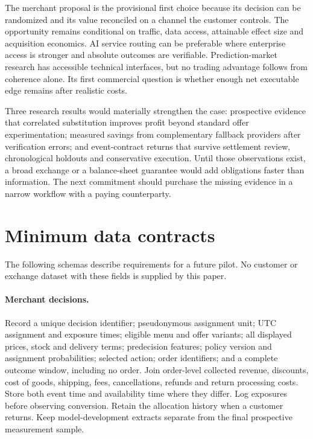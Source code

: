 \documentclass[11pt]{article}
\theoremstyle{remark}\newtheorem{example}{Example}
\begin{document}
The merchant proposal is the provisional first choice because its decision
can be randomized and its value reconciled on a channel the customer controls.
The opportunity remains conditional on traffic, data access, attainable effect
size and acquisition economics. AI service routing can be preferable where
enterprise access is stronger and absolute outcomes are verifiable.
Prediction-market research has accessible technical interfaces, but no trading
advantage follows from coherence alone. Its first commercial question is
whether enough net executable edge remains after realistic costs.

Three research results would materially strengthen the case: prospective
evidence that correlated substitution improves profit beyond standard offer
experimentation; measured savings from complementary fallback providers after
verification errors; and event-contract returns that survive settlement review,
chronological holdouts and conservative execution. Until those observations
exist, a broad exchange or a balance-sheet guarantee would add obligations
faster than information. The next commitment should purchase the missing
evidence in a narrow workflow with a paying counterparty.

\appendix
\section{Minimum data contracts}
The following schemas describe requirements for a future pilot. No customer
or exchange dataset with these fields is supplied by this paper.

\paragraph{Merchant decisions.}
Record a unique decision identifier; pseudonymous assignment unit; UTC
assignment and exposure times; eligible menu and offer variants; all displayed
prices, stock and delivery terms; predecision features; policy version and
assignment probabilities; selected action; order identifiers; and a complete
outcome window, including no order. Join order-level collected revenue,
discounts, cost of goods, shipping, fees, cancellations, refunds and return
processing costs. Store both event time and availability time where they differ.
Log exposures before observing conversion. Retain the allocation history when
a customer returns. Keep model-development extracts separate from the final
prospective measurement sample.
\end{document}

